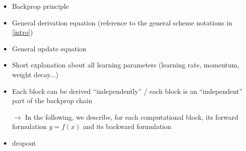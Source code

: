 \begin{itemize}
 \item Backprop principle
 \item General derivation equation (reference to the general scheme notations in \ref{intro})
 \item General update equation
 \item Short explanation about all learning parameters (learning rate, momentum, weight decay...)
 \item Each block can be derived ``independently'' / each block is an ``independent'' part of the backprop chain
 \item[$\rightarrow$] In the following, we describe, for each computational block, its forward formulation $y = f(x)$ and its backward formulation
 \item dropout
\end{itemize}